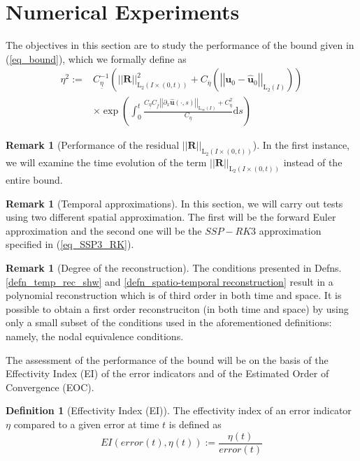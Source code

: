 \documentclass[12pt,a4paper]{article}
\numberwithin{equation}{section}
\theoremstyle{definition}
\newcommand{\Norm}[1]{\left|\left|#1\right|\right|}
\newcommand{\vect}[1]{\textbf{#1}}
\newcommand{\leb}{\text{L}}
\newcommand{\Coeta}{C_{\overline{\eta}}}
\newcommand{\Cof}{C_{\overline{f}}}
\newcommand{\Cueta}{C_{\underline{\eta}}}
\newcommand{\qp}[1]{\left(#1\right)}
\newcommand{\rec}[1]{\widehat{{#1}}}
\newtheorem{Defn}[subsection]{Definition}
\newtheorem{Rem}[subsection]{Remark}
\begin{document}
\section{Numerical Experiments}\label{sec_num_exp}
The objectives in this section are to study the performance of the bound given in (\ref{eq_bound}), which we formally define as 
\begin{equation}\label{eq_estimator}
\begin{aligned}
\eta^2:=& C_{\underline{\eta}}^{-1}\qp{\Norm{\vect{R}}^2_{\leb_2\qp{I\times\qp{0,t}}} +C_{\overline{\eta}}\qp{\Norm{\vect{u}_0-\rec{\vect{u}}_0}_{\leb_2\qp{I}}}}\\
&\times\exp\qp{\int^t_0\frac{\Cueta\Cof\Norm{\partial_x\rec{\vect{u}}\qp{\cdot,s}}_{\leb_\infty\qp{I}}+\Coeta^2}{\Cueta}\mathrm{d}s}
\end{aligned}
\end{equation}
\begin{Rem}[Performance of the residual $\Norm{\vect{R}}_{\leb_2\qp{I\times\qp{0,t}}}$]
In the first instance, we will examine the time evolution of the term $\Norm{\vect{R}}_{\leb_2\qp{I\times\qp{0,t}}}$ instead of the entire bound.
\end{Rem}
\begin{Rem}[Temporal approximations]
In this section, we will carry out tests using two different spatial approximation.   The first will be the forward Euler approximation and the second one will be the $SSP-RK3$ approximation specified in (\ref{eq_SSP3_RK}).
\end{Rem}
\begin{Rem}[Degree of the reconstruction]\label{rem_degree_of_reconstruction}
The conditions presented in Defns. \ref{defn_temp_rec_shw} and \ref{defn_spatio-temporal reconstruction} result in a polynomial reconstruction which is of third order in both time and space.  It is possible to obtain a first order reconstruciton (in both time and space) by using only a small subset of the conditions used in the aforementioned definitions: namely, the nodal equivalence conditions. 
\end{Rem}
The assessment of the performance of the bound will be on the basis of the Effectivity Index (EI) of the error indicators and of the Estimated Order of Convergence (EOC).
\begin{Defn}[Effectivity Index (EI)] The effectivity index of an error indicator $\eta$ compared to a given error at time $t$ is defined as
\begin{equation}\label{eq_EI}
EI\qp{error\qp{t}, \eta\qp{t}} := \frac{\eta\qp{t}}{error\qp{t}}
\end{equation}
\end{Defn}
\end{document}
